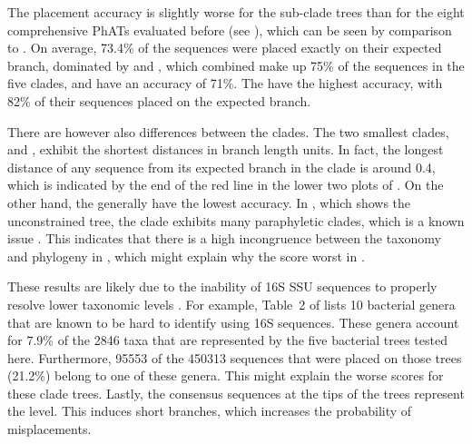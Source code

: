 The placement accuracy is slightly worse for the sub-clade trees
than for the eight comprehensive \acp{PhAT} evaluated before
(see ),
which can be seen by comparison to .
On average, 73.4\% of the sequences were placed exactly on their expected branch,
dominated by  and ,
which combined make up 75\% of the sequences in the five clades, and have an accuracy of 71\%.
The  have the highest accuracy,
with 82\% of their sequences placed on the expected branch.

There are however also differences between the clades.
The two smallest clades,  and ,
exhibit the shortest distances in branch length units.
In fact, the longest distance of any sequence from its expected branch in the  clade
is around \num{0.4}, which is indicated by the end of the red line in the lower two plots of .
On the other hand, the  generally have the lowest accuracy.
In , which shows the unconstrained  tree,
the  clade exhibits many paraphyletic clades,
which is a known issue \citep{Parks2018}.
This indicates that there is a high incongruence
between the  taxonomy and phylogeny in ,
which might explain why the  score worst in .

These results are likely due to the inability of 16S SSU sequences to properly resolve lower taxonomic levels
\citep{Mignard2006,Petti2007,Janda2007}.
For example, Table~2 of \citep{Janda2007} lists \num{10} bacterial genera
that are known to be hard to identify using 16S sequences.
These genera account for \num{7.9}\% of the \num{2846} taxa
that are represented by the five bacterial trees tested here.
Furthermore, \num{95 553} of the \num{450 313} sequences that were placed on those trees (\num{21.2}\%)
belong to one of these genera.
This might explain the worse scores for these clade trees.
Lastly, the consensus sequences at the tips of the trees represent the  level.
This induces short branches, which increases the probability of misplacements.


